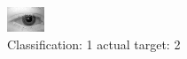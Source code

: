 \begin{figure}[h!]
\begin{center}
\includegraphics[width=0.60\columnwidth]{figures/ID457_class_1_target_2.png}
\end{center}
\caption{ Classification: 1 actual target: 2}
\label{fig:ID457_class_1_target_2}
\end{figure}
